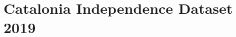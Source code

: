 \documentclass[10pt, a4paper]{article}
\begin{document}









\section{Catalonia Independence Dataset 2019}
\label{sec:independence}
\end{document}
